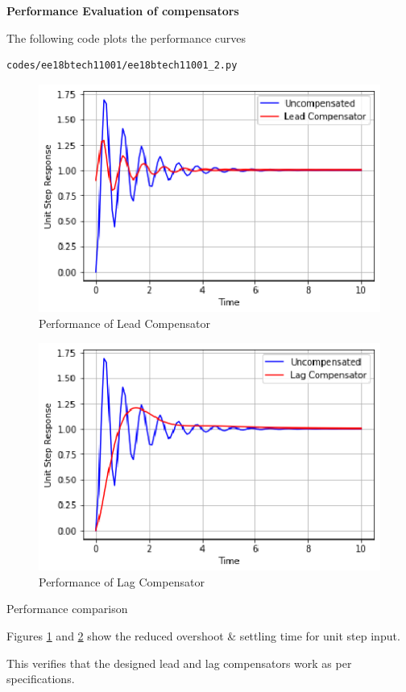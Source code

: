 \textbf{Performance Evaluation of compensators}

The following code plots the performance curves

\begin{lstlisting}[frame=single]
codes/ee18btech11001/ee18btech11001_2.py
\end{lstlisting}
\begin{figure}[!ht]
\centering
    \includegraphics[width=\columnwidth]{./figs/ee18btech11001/ee18btech11001_4.eps}
  \caption{Performance of Lead Compensator}
  \label{fig:ee18btech11001_fig4}
\end{figure}
\begin{figure}[!ht]
\centering
    \includegraphics[width=\columnwidth]{./figs/ee18btech11001/ee18btech11001_5.eps}
  \caption{Performance of Lag Compensator}
  \label{fig:ee18btech11001_fig5}
\end{figure}

\begin{table}[!ht]
\centering

\caption{Performance comparison}
\label{table:ee18btech11001_2}
\end{table}
Figures \ref{fig:ee18btech11001_fig4} and \ref{fig:ee18btech11001_fig5} show the reduced overshoot \& settling time for unit step input. 

This verifies that the designed lead and lag compensators work as per specifications. 
